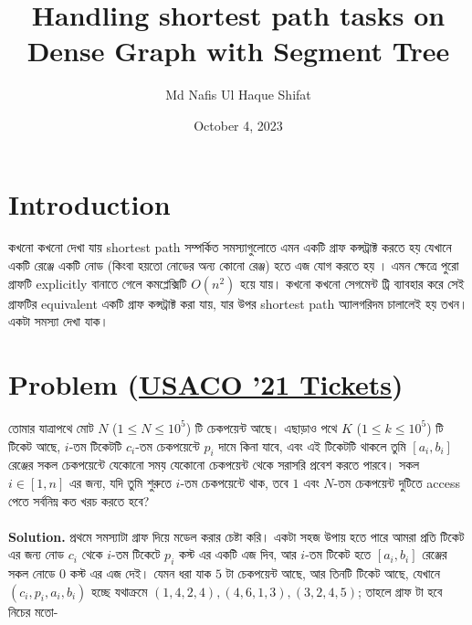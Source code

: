 \documentclass[11pt]{article}
\title{Handling shortest path tasks on Dense Graph with Segment Tree}
\author{Md Nafis Ul Haque Shifat}
\date{October 4, 2023}
\begin{document}
\maketitle


\section{Introduction}
কখনো কখনো দেখা যায় shortest path সম্পর্কিত সমস্যাগুলোতে এমন একটি গ্রাফ কন্সট্রাক্ট করতে হয় যেখানে একটি রেঞ্জে একটি নোড (কিংবা হয়তো নোডের অন্য কোনো রেঞ্জ) হতে এজ যোগ করতে হয় । এমন ক্ষেত্রে পুরো গ্রাফটি explicitly বানাতে গেলে কমপ্লেক্সিটি $O(n^2)$ হয়ে যায়। কখনো কখনো সেগমেন্ট ট্রি ব্যাবহার করে সেই গ্রাফটির equivalent একটি গ্রাফ কন্সট্রাক্ট করা যায়, যার উপর shortest path অ্যালগরিদম চালালেই হয় তখন। একটা সমস্যা দেখা যাক। 

\section{Problem (\href{http://usaco.org/index.php?page=viewproblem2&cpid=1164}{USACO '21 Tickets})}
তোমার যাত্রাপথে মোট $N$ ($1 \leq N \leq 10^5$) টি চেকপয়েন্ট আছে। এছাড়াও পথে $K$ ($1 \leq k \leq 10^5$) টি টিকেট আছে, $i$-তম টিকেটটি $c_i$-তম চেকপয়েন্টে $p_i$ দামে কিনা যাবে, এবং এই টিকেটটি থাকলে তুমি $[a_i,b_i]$ রেঞ্জের সকল চেকপয়েন্টে যেকোনো সময় যেকোনো চেকপয়েন্ট থেকে সরাসরি প্রবেশ করতে পারবে। সকল $i \in [1, n]$ এর জন্য, যদি তুমি শুরুতে $i$-তম চেকপয়েন্টে থাক, তবে $1$ এবং $N$-তম চেকপয়েন্ট দুটিতে access পেতে সর্বনিম্ন কত খরচ করতে হবে? 
\\ \\
\textbf{Solution.} প্রথমে সমস্যাটা গ্রাফ দিয়ে মডেল করার চেষ্টা করি। একটা সহজ উপায় হতে পারে আমরা প্রতি টিকেট এর জন্য নোড $c_i$ থেকে $i$-তম টিকেটে $p_i$ কস্ট এর একটি এজ দিব, আর $i$-তম টিকেট হতে $[a_i,b_i]$ রেঞ্জের সকল নোডে $0$ কস্ট এর এজ দেই। যেমন ধরা যাক $5$ টা চেকপয়েন্ট আছে, আর তিনটি টিকেট আছে, যেখানে $(c_i, p_i, a_i, b_i)$ হচ্ছে যথাক্রমে $(1, 4, 2, 4), (4, 6, 1, 3), (3, 2, 4, 5)$; তাহলে গ্রাফ টা হবে নিচের মতো- 
\\
\end{document}
